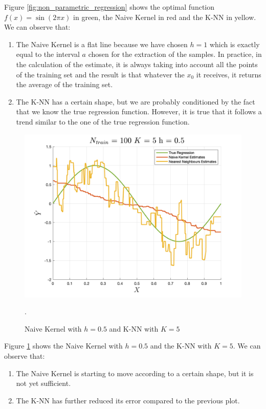 Figure \ref*{fig:non_parametric_regression} shows the optimal function $f(x)=\sin(2\pi x)$ in green, the Naive Kernel in red and the K-NN in yellow. We can observe that:

\begin{enumerate}
    \item The Naive Kernel is a flat line because we have chosen $h=1$ which is exactly equal to the interval $a$ chosen for the extraction of the samples. In practice, in the calculation of the estimate, it is always taking into account all the points of the training set and the result is that whatever the $x_0$ it receives, it returns the average of the training set.
    \item The K-NN has a certain shape, but we are probably conditioned by the fact that we know the true regression function. However, it is true that it follows a trend similar to the one of the true regression function.
\end{enumerate}

\begin{figure}[H]
    \centering
    \includegraphics[width=\textwidth]{./figures/appendix_a/figure_16.png}
    \caption{Naive Kernel with $h=0.5$ and K-NN with $K=5$}.
    \label{fig:non_parametric_regression_2}
\end{figure}

Figure \ref*{fig:non_parametric_regression_2} shows the Naive Kernel with $h=0.5$ and the K-NN with $K=5$. We can observe that:
\begin{enumerate}
    \item The Naive Kernel is starting to move according to a certain shape, but it is not yet sufficient.
    \item The K-NN has further reduced its error compared to the previous plot.
\end{enumerate}

